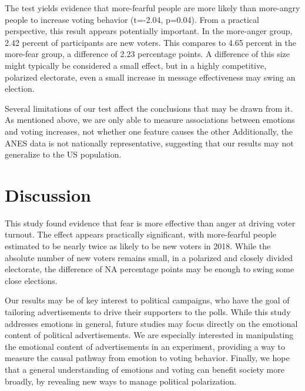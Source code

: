\documentclass[
  letterpaper,
  DIV=11,
  numbers=noendperiod,
  onecolumn]{scrartcl}
\newenvironment{Shaded}{\begin{snugshade}}{\end{snugshade}}
\newcommand{\DecValTok}[1]{\textcolor[rgb]{0.68,0.00,0.00}{#1}}
\newcommand{\FunctionTok}[1]{\textcolor[rgb]{0.28,0.35,0.67}{#1}}
\newcommand{\NormalTok}[1]{\textcolor[rgb]{0.00,0.23,0.31}{#1}}
\newcommand{\OtherTok}[1]{\textcolor[rgb]{0.00,0.23,0.31}{#1}}
\newcommand{\SpecialCharTok}[1]{\textcolor[rgb]{0.37,0.37,0.37}{#1}}
\newcommand{\StringTok}[1]{\textcolor[rgb]{0.13,0.47,0.30}{#1}}
\begin{document}
\begin{Shaded}
\end{Shaded}

The test yields evidence that more-fearful people are more likely than
more-angry people to increase voting behavior (t=-2.04, p=0.04). From a
practical perspective, this result appears potentially important. In the
more-anger group, 2.42 percent of participants are new voters. This
compares to 4.65 percent in the more-fear group, a difference of 2.23
percentage points. A difference of this size might typically be
considered a small effect, but in a highly competitive, polarized
electorate, even a small increase in message effectiveness may swing an
election.

Several limitations of our test affect the conclusions that may be drawn
from it. As mentioned above, we are only able to measure associations
between emotions and voting increases, not whether one feature causes
the other Additionally, the ANES data is not nationally representative,
suggesting that our results may not generalize to the US population.

\section{Discussion}\label{discussion}

This study found evidence that fear is more effective than anger at
driving voter turnout. The effect appears practically significant, with
more-fearful people estimated to be nearly twice as likely to be new
voters in 2018. While the absolute number of new voters remains small,
in a polarized and closely divided electorate, the difference of NA
percentage points may be enough to swing some close elections.

Our results may be of key interest to political campaigns, who have the
goal of tailoring advertisements to drive their supporters to the polls.
While this study addresses emotions in general, future studies may focus
directly on the emotional content of political advertisements. We are
especially interested in manipulating the emotional content of
advertisements in an experiment, providing a way to measure the causal
pathway from emotion to voting behavior. Finally, we hope that a general
understanding of emotions and voting can benefit society more broadly,
by revealing new ways to manage political polarization.
\end{document}
